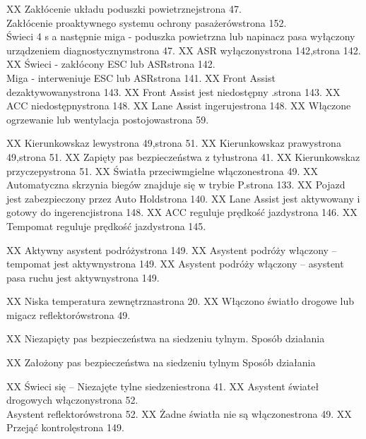 XX	Zakłócenie układu poduszki powietrznej\guillemotright strona 47. \\ Zakłócenie proaktywnego systemu ochrony pasażerów\guillemotright strona 152. \\ Świeci 4 s a następnie miga - poduszka powietrzna lub napinacz pasa wyłączony urządzeniem diagnostycznym\guillemotright strona 47.
XX	ASR wyłączony\guillemotright strona 142,\guillemotright strona 142.
XX	Świeci - zakłócony ESC lub ASR\guillemotright strona 142. \\ Miga - interweniuje ESC lub ASR\guillemotright strona 141.
XX	Front Assist dezaktywowany\guillemotright strona 143.
XX	Front Assist jest niedostępny .\guillemotright strona 143.
XX	ACC niedostępny\guillemotright strona 148.
XX	Lane Assist ingeruje\guillemotright strona 148.
XX	Włączone ogrzewanie lub wentylacja postojowa\guillemotright strona 59.

XX	Kierunkowskaz lewy\guillemotright strona 49,\guillemotright strona 51.
XX	Kierunkowskaz prawy\guillemotright strona 49,\guillemotright strona 51.
XX	Zapięty pas bezpieczeństwa z tyłu\guillemotright strona 41.
XX	Kierunkowskaz przyczepy\guillemotright strona 51.
XX	Światła przeciwmgielne włączone\guillemotright strona 49.
XX	Automatyczna skrzynia biegów znajduje się w trybie P.\guillemotright strona 133.
XX	Pojazd jest zabezpieczony przez Auto Hold\guillemotright strona 140.
XX	Lane Assist jest aktywowany i gotowy do ingerencji\guillemotright strona 148.
XX	ACC reguluje prędkość jazdy\guillemotright strona 146.
XX	Tempomat reguluje prędkość jazdy\guillemotright strona 145.

XX	Aktywny asystent podróży\guillemotright strona 149.
XX	Asystent podróży włączony – tempomat jest aktywny\guillemotright strona 149.
XX	Asystent podróży włączony – asystent pasa ruchu jest aktywny\guillemotright strona
149.

XX	Niska temperatura zewnętrzna\guillemotright strona 20.
XX	Włączono światło drogowe lub migacz reflektorów\guillemotright strona 49.

XX	Niezapięty pas bezpieczeństwa na siedzeniu tylnym. \guillemotright Sposób działania

XX	Założony pas bezpieczeństwa na siedzeniu tylnym \guillemotright Sposób działania

XX	Świeci się -- Niezajęte tylne siedzenie\guillemotright strona 41.
XX	Asystent świateł drogowych włączony\guillemotright strona 52. \\ Asystent reflektorów\guillemotright strona 52.
XX	Żadne światła nie są włączone\guillemotright strona 49.
XX	Przejąć kontrolę\guillemotright strona 149.

